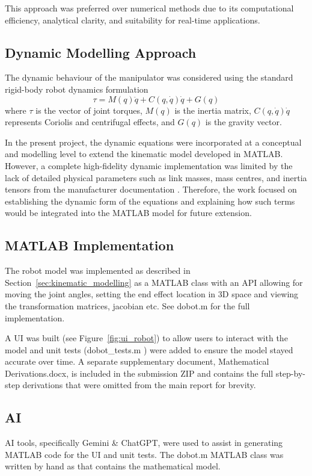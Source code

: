 \documentclass[12pt,a4paper]{article}
\begin{document}
This approach was preferred over numerical methods due to its computational
efficiency, analytical clarity, and suitability for real-time
applications\cite{mathworks2023, craig2005}.

\subsection{Dynamic Modelling Approach}
The dynamic behaviour of the manipulator was considered using the standard
rigid-body robot dynamics formulation \cite{siciliano2009, spong2006}
\[ \tau = M(q)\ddot{q} + C(q, \dot{q})\dot{q} + G(q) \]
where $\tau$ is the vector of joint torques, $M(q)$ is the inertia matrix, $C(q,
\dot{q})\dot{q}$ represents Coriolis and centrifugal effects, and $G(q)$ is the
gravity vector.

In the present project, the dynamic equations were incorporated at a conceptual
and modelling level to extend the kinematic model developed in MATLAB. However,
a complete high-fidelity dynamic implementation was limited by the lack of
detailed physical parameters such as link masses, mass centres, and inertia
tensors from the manufacturer documentation \cite{siciliano2009}. Therefore, the
work focused on establishing the dynamic form of the equations and explaining
how such terms would be integrated into the MATLAB model for future extension.

\subsection{MATLAB Implementation}

The robot model was implemented as described in
Section~\ref{sec:kinematic_modelling} as a MATLAB class with an API allowing for
moving the joint angles, setting the end effect location in 3D space and viewing
the transformation matrices, jacobian etc. See dobot.m \cite{githubDobot} for the full implementation.

A UI \cite{githubUIRobot} was built (see Figure~\ref{fig:ui_robot}) to allow
users to interact with the model and unit tests (dobot\_tests.m
\cite{githubDobotTests}) were added to ensure the model stayed accurate over
time. A separate supplementary document, Mathematical
Derivations.docx\cite{githubMathematicalDerivations}, is included in the
submission ZIP and contains the full step-by-step derivations that were omitted
from the main report for brevity.

\subsection{AI}
AI tools, specifically Gemini \& ChatGPT, were used to assist in generating MATLAB code for
the UI and unit tests. The dobot.m \cite{githubDobot} MATLAB class was written by hand as that
contains the mathematical model.
\end{document}
